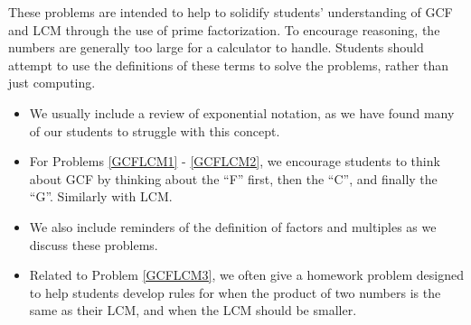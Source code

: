 \documentclass{ximera}
\begin{document}
\begin{instructorNotes}
These problems are intended to help to solidify students' understanding of GCF and LCM through the use of prime factorization.  To encourage reasoning, the numbers are generally too large for a calculator to handle.  Students should attempt to use the definitions of these terms to solve the problems, rather than just computing.

\begin{itemize}
    \item We usually include a review of exponential notation, as we have found many of our students to struggle with this concept.
	\item For Problems \ref{GCFLCM1} - \ref{GCFLCM2}, we encourage students to think about GCF by thinking about the ``F'' first, then the ``C'', and finally the ``G''.  Similarly with LCM.
	\item We also include reminders of the definition of factors and multiples as we discuss these problems.
	\item Related to Problem \ref{GCFLCM3}, we often give a homework problem designed to help students develop rules for when the product of two numbers is the same as their LCM, and when the LCM should be smaller. %
\end{itemize}

\end{instructorNotes}
\end{document}
